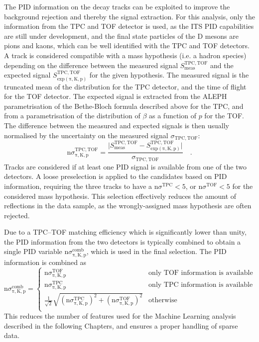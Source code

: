 The PID information on the decay tracks can be exploited to improve the background rejection and thereby the signal extraction. For this analysis, only the information from the TPC and TOF detector is used, as the ITS PID capabilities are still under development, and the final state particles of the D mesons are pions and kaons, which can be well identified with the TPC and TOF detectors. A track is considered compatible with a mass hypothesis (i.e. a hadron species) depending on the difference between the measured signal $S_\mathrm{meas}^\mathrm{TPC,TOF}$ and the expected signal $S_\mathrm{exp (\pi, K, p)}^\mathrm{TPC,TOF}$ for the given hypothesis. The measured signal is the truncated mean of the \dedx distribution for the TPC detector, and the time of flight for the TOF detector. The expected signal is extracted from the ALEPH parametrisation of the Bethe-Bloch formula described above for the TPC, and from a parametrisation of the distribution of $\beta$ as a function of $p$ for the TOF. The difference between the measured and expected signals is then usually normalised by the uncertainty on the measured signal $\sigma_\mathrm{TPC, TOF}$:
\begin{equation*}
    \mathrm{n}\sigma_\mathrm{\pi, K, p}^\mathrm{TPC, TOF} = \frac{\lvert S_\mathrm{meas}^\mathrm{TPC, TOF} - S_\mathrm{exp (\pi, K, p)}^\mathrm{TPC, TOF}\rvert}{\sigma_\mathrm{TPC, TOF}}\quad .
\end{equation*}
Tracks are considered if at least one PID signal is available from one of the two detectors. A loose preselection is applied to the candidates based on PID information, requiring the three tracks to have a $\mathrm{n}\sigma^\mathrm{TPC} < 5$, or $\mathrm{n}\sigma^\mathrm{TOF} < 5$ for the considered mass hypothesis. This selection effectively reduces the amount of reflections in the data sample, as the wrongly-assigned mass hypothesis are often rejected.

Due to a TPC--TOF matching efficiency which is significantly lower than unity, the PID information from the two detectors is typically combined to obtain a single PID variable $\mathrm{n}\sigma^\mathrm{comb}_\mathrm{\pi, K, p}$, which is used in the final selection. The PID information is combined as
\begin{equation*}
    \mathrm{n}\sigma^\mathrm{comb}_\mathrm{\pi, K, p} = 
    \begin{cases}
        \mathrm{n}\sigma^\mathrm{TOF}_\mathrm{\pi, K, p} & \text{only TOF information is available}\\
        \mathrm{n}\sigma^\mathrm{TPC}_\mathrm{\pi, K, p} & \text{only TPC information is available}\\
        \frac{1}{\sqrt{2}}\sqrt{(\mathrm{n}\sigma^\mathrm{TPC}_\mathrm{\pi, K, p})^2 + (\mathrm{n}\sigma^\mathrm{TOF}_\mathrm{\pi, K, p})^2} & \text{otherwise}\\
    \end{cases}
\end{equation*}
This reduces the number of features used for the Machine Learning analysis described in the following Chapters, and ensures a proper handling of sparse data.


